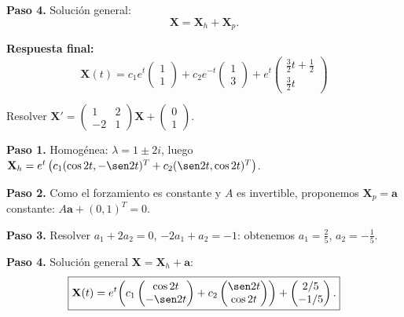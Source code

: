 \begin{example}
\begin{myproof}
\textbf{Paso 4.} Solución general:
\[
\mathbf{X}=\mathbf{X}_h+\mathbf{X}_p.
\]

\textbf{Respuesta final:}
\[
\boxed{
\mathbf{X}(t)=c_1 e^t
\begin{pmatrix}
1\\1
\end{pmatrix}
+c_2 e^{-t}
\begin{pmatrix}
1\\3
\end{pmatrix}
+
e^t
\begin{pmatrix}
\frac32 t+\frac12\\
\frac32 t
\end{pmatrix}
}
\]
\end{myproof}
\end{example}

\begin{example}
Resolver $\mathbf{X}'=\begin{pmatrix}1&2\\-2&1\end{pmatrix}\mathbf{X}+\begin{pmatrix}0\\1\end{pmatrix}$.

\begin{myproof}
\textbf{Paso 1.} Homogénea: $\lambda=1\pm 2i$, luego $\mathbf{X}_h=e^{t}\left(c_1(\cos 2t,-\sen 2t)^T+c_2(\sen 2t,\cos 2t)^T\right)$.

\textbf{Paso 2.} Como el forzamiento es constante y $A$ es invertible, proponemos $\mathbf{X}_p=\mathbf{a}$ constante: $A\mathbf{a}+(0,1)^T=0$.

\textbf{Paso 3.} Resolver $a_1+2a_2=0$, $-2a_1+a_2=-1$: obtenemos $a_1=\tfrac{2}{5}$, $a_2=-\tfrac{1}{5}$.

\textbf{Paso 4.} Solución general $\mathbf{X}=\mathbf{X}_h+\mathbf{a}$:
\[
\boxed{\mathbf{X}(t)=e^{t}\!\left(c_1\begin{pmatrix}\cos 2t\\-\sen 2t\end{pmatrix}+c_2\begin{pmatrix}\sen 2t\\ \cos 2t\end{pmatrix}\right)+\begin{pmatrix}2/5\\-1/5\end{pmatrix}.}
\]
\end{myproof}
\end{example}

